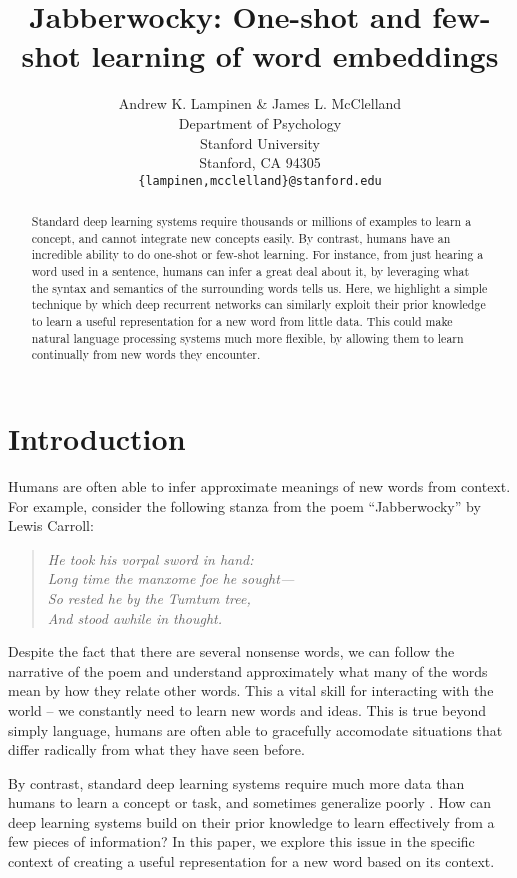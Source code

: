 \documentclass{article}
\title{Jabberwocky: One-shot and few-shot learning of word embeddings}
\author{
  Andrew K. Lampinen \& James L. McClelland\\
  Department of Psychology\\
  Stanford University\\
  Stanford, CA 94305 \\
  \texttt{\{lampinen,mcclelland\}@stanford.edu} \\
}
\begin{document}
\maketitle

\begin{abstract}
Standard deep learning systems require thousands or millions of examples to learn a concept, and cannot integrate new concepts easily. By contrast, humans have an incredible ability to do one-shot or few-shot learning. For instance, from just hearing a word used in a sentence, humans can infer a great deal about it, by leveraging what the syntax and semantics of the surrounding words tells us. Here, we highlight a simple technique by which deep recurrent networks can similarly exploit their prior knowledge to learn a useful representation for a new word from little data. This could make natural language processing systems much more flexible, by allowing them to learn continually from new words they encounter. 
\end{abstract}

\section{Introduction}
Humans are often able to infer approximate meanings of new words from context. For example, consider the following stanza from the poem ``Jabberwocky'' by Lewis Carroll: 
\begin{quote}
\centering
\textit{
He took his vorpal sword in hand:\\
Long time the manxome foe he sought—\\
So rested he by the Tumtum tree,\\
And stood awhile in thought.}
\end{quote}
Despite the fact that there are several nonsense words, we can follow the narrative of the poem and understand approximately what many of the words mean by how they relate other words. This a vital skill for interacting with the world -- we constantly need to learn new words and ideas. This is true beyond simply language, humans are often able to gracefully accomodate situations that differ radically from what they have seen before.\par 
By contrast, standard deep learning systems require much more data than humans to learn a concept or task, and sometimes generalize poorly \cite{Lake2016}. How can deep learning systems build on their prior knowledge to learn effectively from a few pieces of information? In this paper, we explore this issue in the specific context of creating a useful representation for a new word based on its context. \par
\end{document}
